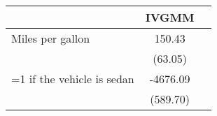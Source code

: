 \begin{tabular}{lcc}
\toprule
 & IVGMM \\
\midrule
Miles per gallon & 150.43 \\
  & (63.05) \\
=1 if the vehicle is sedan & -4676.09 \\
  & (589.70) \\
\bottomrule
\end{tabular}

